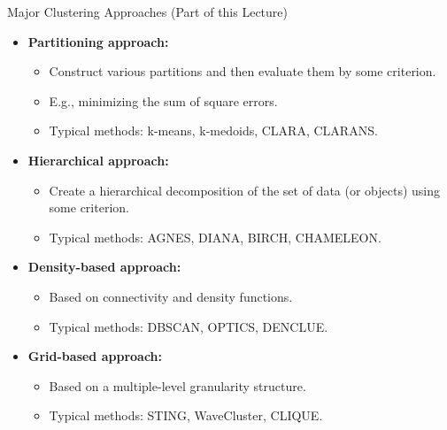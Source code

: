 \begin{frame}{Major Clustering Approaches (Part of this Lecture)}
	\begin{itemize}
		\item \textbf{Partitioning approach:}
		      \begin{itemize}
			      \item Construct various partitions and then evaluate them by some
			            criterion.
			      \item E.g., minimizing the sum of square errors.
			      \item Typical methods: k-means, k-medoids, CLARA, CLARANS.
		      \end{itemize}
		\item \textbf{Hierarchical approach:}
		      \begin{itemize}
			      \item Create a hierarchical decomposition of the set of data (or
			            objects) using some criterion.
			      \item Typical methods: AGNES, DIANA, BIRCH, CHAMELEON.
		      \end{itemize}
		\item \textbf{Density-based approach:}
		      \begin{itemize}
			      \item Based on connectivity and density functions.
			      \item Typical methods: DBSCAN, OPTICS, DENCLUE.
		      \end{itemize}
		\item \textbf{Grid-based approach:}
		      \begin{itemize}
			      \item Based on a multiple-level granularity structure.
			      \item Typical methods: STING, WaveCluster, CLIQUE.
		      \end{itemize}
	\end{itemize}
\end{frame}

